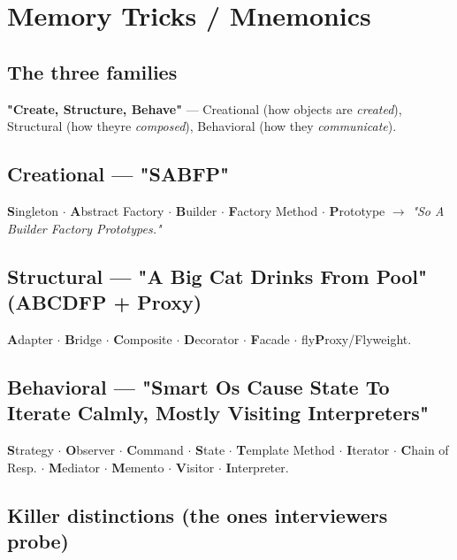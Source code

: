 \documentclass[11pt]{article}
\begin{document}
\section{Memory Tricks / Mnemonics}\label{memory-tricks--mnemonics}

\subsection{The three families}\label{the-three-families}

\textbf{"Create, Structure, Behave"} --- Creational (how objects are \emph{created}), Structural (how they\textquotesingle re \emph{composed}), Behavioral (how they \emph{communicate}).

\subsection{Creational --- "SABFP"}\label{creational--sabfp}

\textbf{S}ingleton \(\cdot\) \textbf{A}bstract Factory \(\cdot\) \textbf{B}uilder \(\cdot\) \textbf{F}actory Method \(\cdot\) \textbf{P}rototype \(\rightarrow\) \emph{"So A Builder Factory Prototypes."}

\subsection{Structural --- "A Big Cat Drinks From Pool" (ABCDFP + Proxy)}\label{structural--a-big-cat-drinks-from-pool-abcdfp--proxy}

\textbf{A}dapter \(\cdot\) \textbf{B}ridge \(\cdot\) \textbf{C}omposite \(\cdot\) \textbf{D}ecorator \(\cdot\) \textbf{F}acade \(\cdot\) fly\textbf{P}roxy/Flyweight.

\subsection{Behavioral --- "Smart Os Cause State To Iterate Calmly, Mostly Visiting Interpreters"}\label{behavioral--smart-os-cause-state-to-iterate-calmly-mostly-visiting-interpreters}

\textbf{S}trategy \(\cdot\) \textbf{O}bserver \(\cdot\) \textbf{C}ommand \(\cdot\) \textbf{S}tate \(\cdot\) \textbf{T}emplate Method \(\cdot\) \textbf{I}terator \(\cdot\) \textbf{C}hain of Resp. \(\cdot\) \textbf{M}ediator \(\cdot\) \textbf{M}emento \(\cdot\) \textbf{V}isitor \(\cdot\) \textbf{I}nterpreter.

\subsection{Killer distinctions (the ones interviewers probe)}\label{killer-distinctions-the-ones-interviewers-probe}
\end{document}
